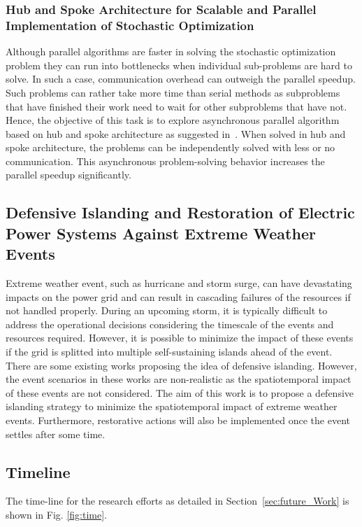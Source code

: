 \documentclass[hidelinks, 12pt]{article}
\begin{document}
\subsubsection{Hub and Spoke Architecture for Scalable and Parallel Implementation of Stochastic Optimization}
Although parallel algorithms are faster in solving the stochastic optimization problem they can run into bottlenecks when individual sub-problems are hard to solve. In such a case, communication overhead can outweigh the parallel speedup. Such problems can rather take more time than serial methods as subproblems that have finished their work need to wait for other subproblems that have not. Hence, the objective of this task is to explore asynchronous parallel algorithm based on hub and spoke architecture as suggested in~\cite{knueven2020parallel}. When solved in hub and spoke architecture, the problems can be independently solved with less or no communication. This asynchronous problem-solving behavior increases the parallel speedup significantly. 

\subsection{Defensive Islanding and Restoration of Electric Power Systems Against Extreme Weather Events}
Extreme weather event, such as hurricane and storm surge, can have devastating impacts on the power grid and can result in cascading failures of the resources if not handled properly. During an upcoming storm, it is typically difficult to address the operational decisions considering the timescale of the events and resources required. However, it is possible to minimize the impact of these events if the grid is splitted into multiple self-sustaining islands ahead of the event. There are some existing works proposing the idea of defensive islanding. However, the event scenarios in these works are non-realistic as the spatiotemporal impact of these events are not considered. The aim of this work is to propose a defensive islanding strategy to minimize the spatiotemporal impact of extreme weather events. Furthermore, restorative actions will also be implemented once the event settles after some time.    

\clearpage
\subsection{Timeline}
The time-line for the research efforts as detailed in Section~\ref{sec:future_Work} is shown in Fig. \ref{fig:time}.
\end{document}
